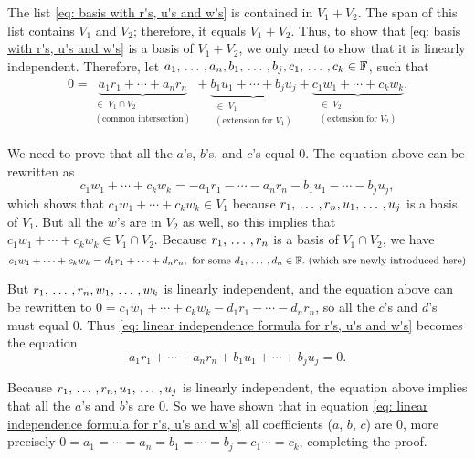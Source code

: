 \begin{prf}
The list \eqref{eq: basis with r's, u's and w's} is contained in $V_1 + V_2$. The span of this list contains $V_1$ and $V_2$; therefore, it equals $V_1 + V_2$. Thus, to show that \eqref{eq: basis with r's, u's and w's} is a basis of $V_1 + V_2$, we only need to show that it is linearly independent. Therefore, let $a_1, {\, \ldots \,\,}, a_n, b_1, {\, \ldots \,\,}, b_j, c_1, {\, \ldots \,\,}, c_k \in \mathbb{F}$, such that
\begin{equation}
  \label{eq: linear independence formula for r's, u's and w's}
  \begin{aligned}
    0 = \underbrace{a_1 r_1 + \cdots + a_n r_n}_{\substack{\in \; V_1 \cap V_2 \\ (\text{common intersection})}}
    + \underbrace{b_1 u_1 + \cdots + b_j u_j}_{\substack{\in \; V_1 \\ (\text{extension for } V_1 )}}
    + \underbrace{c_1 w_1 + \cdots + c_k w_k}_{\substack{\in \; V_2 \\ (\text{extension for } V_2 ) }}.
  \end{aligned}
\end{equation}

We need to prove that all the $a$'s, $b$'s, and $c$'s equal $0$. The equation above can be rewritten as
\begin{equation}
  c_1 w_1 + \cdots + c_k w_k = - a_1 r_1 - \cdots - a_n r_n - b_1 u_1 - \cdots - b_j u_j,
\end{equation}
which shows that $c_1 w_1 + \cdots + c_k w_k \in V_1$ because $r_1, {\, \ldots \,\,}, r_n, u_1, {\, \ldots \,\,}, u_j$ is a basis of $V_1$. But all the $w$'s are in $V_2$ as well, so this implies that $c_1 w_1 + \cdots + c_k w_k \in V_1 \cap V_2$. Because $r_1, {\, \ldots \,\,}, r_n$ is a basis of $V_1 \cap V_2$, we have
\begin{equation}
  c_1 w_1 + \cdots + c_k w_k = d_1 r_1 + \cdots + d_n r_n, \text{ for some } d_1, {\, \ldots \,\,}, d_n \in \mathbb{F}. \text{ (which are newly introduced here)}
\end{equation}

But $r_1, {\, \ldots \,\,}, r_n, w_1, {\, \ldots \,\,}, w_k$ is linearly independent, and the equation above can be rewritten to $0 = c_1 w_1 + \cdots + c_k w_k - d_1 r_1 - \cdots - d_n r_n$, so all the $c$'s and $d$'s must equal $0$. Thus \eqref{eq: linear independence formula for r's, u's and w's} becomes the equation
\begin{equation}
  a_1 r_1 + \cdots + a_n r_n + b_1 u_1 + \cdots + b_j u_j = 0.
\end{equation}

Because $r_1, {\, \ldots \,\,}, r_n, u_1, {\, \ldots \,\,}, u_j$ is linearly independent, the equation above implies that all the $a$'s and $b$'s are $0$. So we have shown that in equation \eqref{eq: linear independence formula for r's, u's and w's} all coefficients ($a$, $b$, $c$) are $0$, more precisely $  0 = a_1 = \cdots = a_n = b_1 = \cdots =  b_j = c_1 \cdots =  c_k$,
completing the proof.
\end{prf}

